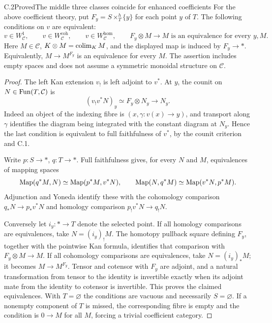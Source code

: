 \begin{claim}{C.2}{Proved}{The middle three classes coincide for enhanced coefficients}
For the above coefficient theory, put $F_y=S\times_T^h\{y\}$ for each point $y$ of $T$.  The following conditions on $v$ are equivalent:
\[
 v\in W_{\mathcal C}^{1},\qquad
 v\in W_{\mathcal C}^{\mathrm{coh}},\qquad
 v\in W_{\mathcal C}^{\mathrm{hom}},\qquad
 F_y\otimes M\longrightarrow M\text{ is an equivalence for every }y,M.
\]
Here $M\in\mathcal C$, $K\otimes M=\operatorname*{colim}_K M$, and the displayed map is induced by $F_y\to *$.  Equivalently, $M\to M^{F_y}$ is an equivalence for every $M$.  The assertion includes empty spaces and does not assume a symmetric monoidal structure on $\mathcal C$.
\end{claim}
\begin{proof}
The left Kan extension $v_!$ is left adjoint to $v^*$.  At $y$, the counit on $N\in\operatorname{Fun}(T,\mathcal C)$ is
\[
 (v_!v^*N)_y\simeq F_y\otimes N_y\longrightarrow N_y.
\]
Indeed an object of the indexing fibre is $(x,\gamma:v(x)\to y)$, and transport along $\gamma$ identifies the diagram being integrated with the constant diagram at $N_y$.  Hence the last condition is equivalent to full faithfulness of $v^*$, by the counit criterion and C.1.

Write $p:S\to *$, $q:T\to *$.  Full faithfulness gives, for every $N$ and $M$, equivalences of mapping spaces
\[
 \operatorname{Map}(q^*M,N)\simeq\operatorname{Map}(p^*M,v^*N),\qquad
 \operatorname{Map}(N,q^*M)\simeq\operatorname{Map}(v^*N,p^*M).
\]
Adjunction and Yoneda identify these with the cohomology comparison $q_*N\to p_*v^*N$ and homology comparison $p_!v^*N\to q_!N$.

Conversely let $i_y:*\to T$ denote the selected point.  If all homology comparisons are equivalences, take $N=(i_y)_!M$.  The homotopy pullback square defining $F_y$, together with the pointwise Kan formula, identifies that comparison with $F_y\otimes M\to M$.  If all cohomology comparisons are equivalences, take $N=(i_y)_*M$; it becomes $M\to M^{F_y}$.  Tensor and cotensor with $F_y$ are adjoint, and a natural transformation from tensor to the identity is invertible exactly when its adjoint mate from the identity to cotensor is invertible.  This proves the claimed equivalences.  With $T=\varnothing$ the conditions are vacuous and necessarily $S=\varnothing$.  If a nonempty component of $T$ is missed, the corresponding fibre is empty and the condition is $0\to M$ for all $M$, forcing a trivial coefficient category.
\end{proof}

